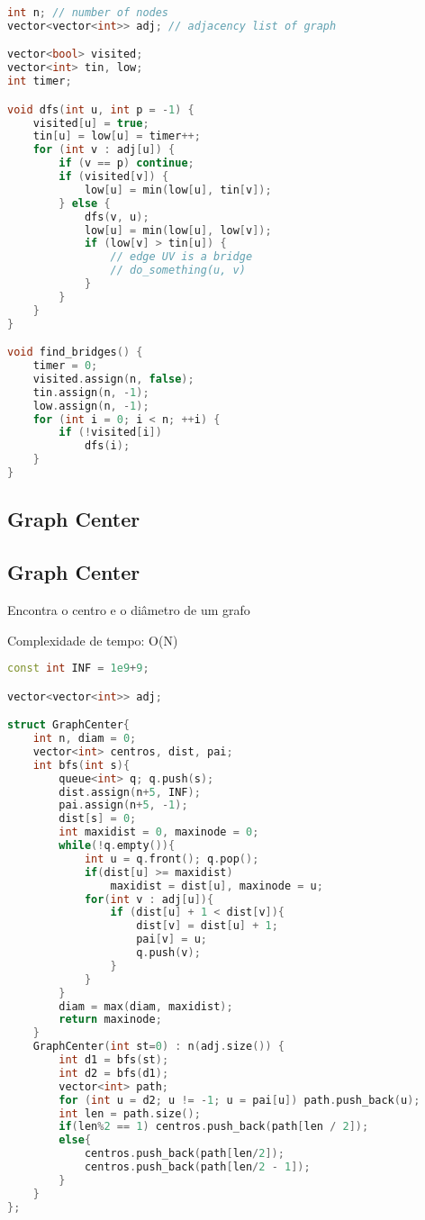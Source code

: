 \documentclass[11pt, a4paper, twoside]{article}
\begin{document}
\begin{multicols}{2}
\begin{lstlisting}[language=C++]
int n; // number of nodes
vector<vector<int>> adj; // adjacency list of graph

vector<bool> visited;
vector<int> tin, low;
int timer;

void dfs(int u, int p = -1) {
    visited[u] = true;
    tin[u] = low[u] = timer++;
    for (int v : adj[u]) {
        if (v == p) continue;
        if (visited[v]) {
            low[u] = min(low[u], tin[v]);
        } else {
            dfs(v, u);
            low[u] = min(low[u], low[v]);
            if (low[v] > tin[u]) {
                // edge UV is a bridge
                // do_something(u, v)
            }
        }
    }
}

void find_bridges() {
    timer = 0;
    visited.assign(n, false);
    tin.assign(n, -1);
    low.assign(n, -1);
    for (int i = 0; i < n; ++i) {
        if (!visited[i])
            dfs(i);
    }
}
\end{lstlisting}
\end{multicols}

\subsection{Graph Center}

\subsection{Graph Center}


Encontra o centro e o diâmetro de um grafo

Complexidade de tempo: O(N)

\begin{lstlisting}[language=C++]
const int INF = 1e9+9;

vector<vector<int>> adj;

struct GraphCenter{
    int n, diam = 0;
    vector<int> centros, dist, pai;
    int bfs(int s){
        queue<int> q; q.push(s);
        dist.assign(n+5, INF);
        pai.assign(n+5, -1);
        dist[s] = 0;
        int maxidist = 0, maxinode = 0;
        while(!q.empty()){
            int u = q.front(); q.pop();
            if(dist[u] >= maxidist)
                maxidist = dist[u], maxinode = u;
            for(int v : adj[u]){
                if (dist[u] + 1 < dist[v]){
                    dist[v] = dist[u] + 1;
                    pai[v] = u;
                    q.push(v);
                }
            }
        }
        diam = max(diam, maxidist);
        return maxinode;
    }
    GraphCenter(int st=0) : n(adj.size()) {
        int d1 = bfs(st);
        int d2 = bfs(d1);
        vector<int> path;
        for (int u = d2; u != -1; u = pai[u]) path.push_back(u);
        int len = path.size();
        if(len%2 == 1) centros.push_back(path[len / 2]);
        else{
            centros.push_back(path[len/2]);
            centros.push_back(path[len/2 - 1]);
        }
    }
};
\end{lstlisting}
\end{document}

